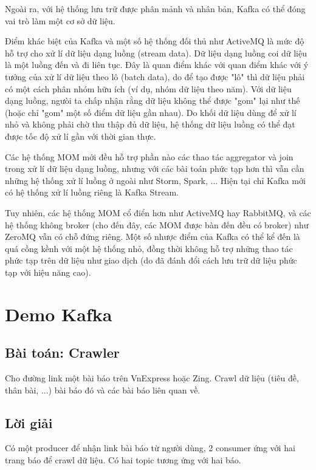 \documentclass{article}
\begin{document}
Ngoài ra, với hệ thống lưu trữ được phân mảnh và nhân bản, Kafka có thể đóng vai
trò làm một cơ sở dữ liệu.

Điểm khác biệt của Kafka và một số hệ thống đối thủ như ActiveMQ là mức độ hỗ
trợ cho xử lí dữ liệu dạng luồng (stream data). Dữ liệu dạng luồng coi dữ liệu
là một luồng đến và đi liên tục. Đây là quan điểm khác với quan điểm khác với ý
tưởng của xử lí dữ liệu theo lô (batch data), do để tạo được "lô" thì dữ liệu
phải có một cách phân nhóm hữu ích (ví dụ, nhóm dữ liệu theo năm). Với dữ liệu
dạng luồng, ngưòi ta chấp nhận rằng dữ liệu không thể được "gom" lại như thế
(hoặc chỉ "gom" một số điểm dữ liệu gần nhau). Do khối dữ liệu dùng để xử lí nhỏ
và không phải chờ thu thập đủ dữ liệu, hệ thống dữ liệu luồng có thể đạt được
tốc độ xử lí gần với thời gian thực.

Các hệ thống MOM mới đều hỗ trợ phần nào các thao tác aggregator và join trong
xử lí dữ liệu dạng luồng, nhưng với các bài toán phức tạp hơn thì vẫn cần những
hệ thống xử lí luồng ở ngoài như Storm, Spark, ... Hiện tại chỉ Kafka mới có hệ
thống xử lí luồng riêng là Kafka Stream.

Tuy nhiên, các hệ thống MOM cổ điển hơn như ActiveMQ hay RabbitMQ, và các hệ
thống không broker (cho đến đây, các MOM được bàn đến đều có broker) như ZeroMQ
vẫn có chỗ đứng riêng. Một số nhược điểm của Kafka có thể kể đến là quá cồng
kềnh với một hệ thống nhỏ, đồng thời không hỗ trợ những thao tác phức tạp trên
dữ liệu như giao dịch (do đã đánh đổi cách lưu trữ dữ liệu phức tạp với hiệu
năng cao).

\section{Demo Kafka}

\subsection{Bài toán: Crawler}

Cho đường link một bài báo trên VnExpress hoặc Zing. Crawl dữ liệu (tiêu đề,
thân bài, ...) bài báo đó và các bài báo liên quan về.

\subsection{Lời giải}

Có một producer để nhận link bài báo từ người dùng, 2 consumer ứng với hai trang
báo để crawl dữ liệu. Có hai topic tương ứng với hai báo.
\end{document}
